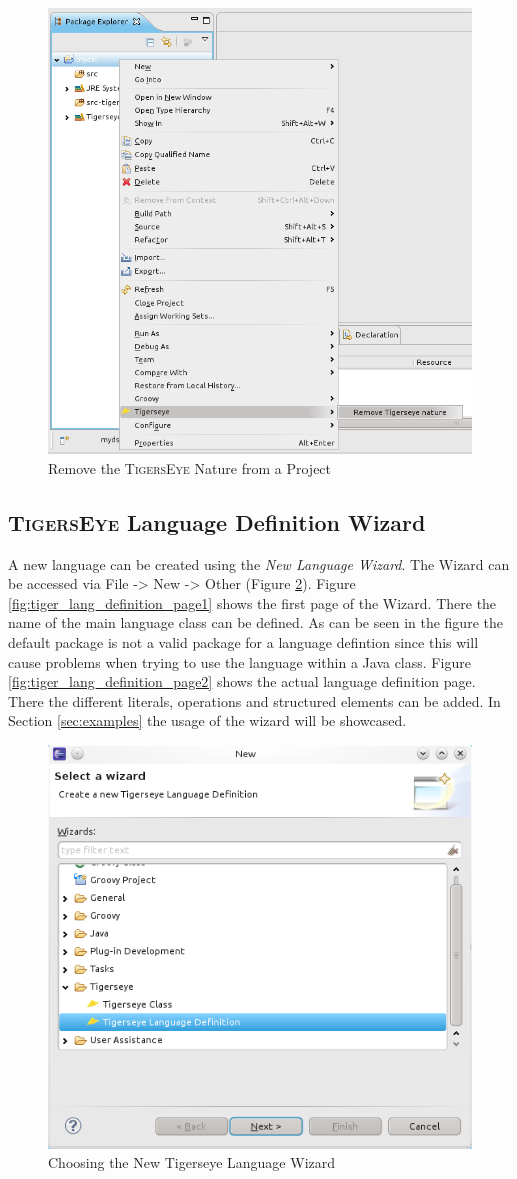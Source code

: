 \documentclass[article,colorback,accentcolor=tud4c]{tudreport}
\newcommand\tiger{%
  \textsc{TigersEye}
}
\begin{document}
	\begin{figure}
	  \centering
	  \includegraphics[width=.5\textwidth,keepaspectratio=true]{./pics/remove_tigerseye_nature.png}
	  \caption{Remove the \tiger Nature from a Project}
	  \label{fig:remove_tiger_nature}
	\end{figure}
	
	\subsection{\tiger Language Definition Wizard}
	  A new language can be created using the \textit{New Language Wizard}. The Wizard can be accessed via File -> New -> Other (Figure \ref{fig:new_tiger_lang}). Figure \ref{fig:tiger_lang_definition_page1} shows the first page of the Wizard. There the name of the main language class can be defined. As can be seen in the figure the default package is not a valid package for a language defintion since this will cause problems when trying to use the language within a Java class. Figure \ref{fig:tiger_lang_definition_page2} shows the actual language definition page. There the different literals, operations and structured elements can be added. In Section \ref{sec:examples} the usage of the wizard will be showcased.
	
	\begin{figure}
	  \centering
	  \includegraphics[width=.5\textwidth,keepaspectratio=true]{./pics/new_tigesreye_language.png}
	  \caption{Choosing the New Tigerseye Language Wizard}
	  \label{fig:new_tiger_lang}
	\end{figure}
\end{document}
